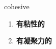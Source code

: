 
\begin{frame}
{\huge cohesive}
\begin{center}
\begin{enumerate}\Large
  \item \textbf{有粘性的}
  \item \textbf{有凝聚力的}
\end{enumerate}
\end{center}
\end{frame}
